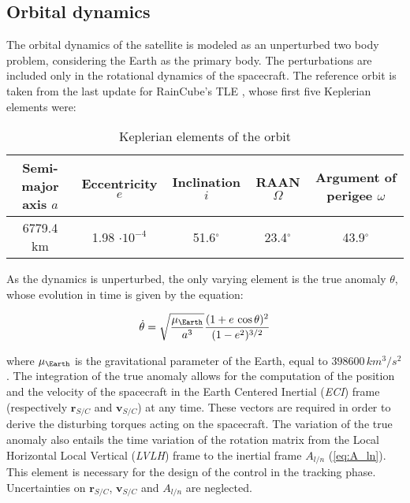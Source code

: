\subsection{Orbital dynamics}

The orbital dynamics of the satellite is modeled as an unperturbed two body problem, considering the Earth as the primary body. The perturbations are included only in the rotational dynamics of the spacecraft. The reference orbit is taken from the last update for RainCube's TLE \cite{raincube_orbit}, whose first five Keplerian elements were:

\begin{table}[h!]
    \centering
    \caption{Keplerian elements of the orbit}
    \begin{tabular}{ccccc}
    \toprule
    \toprule
    \textbf{Semi-major axis} $a$ & \textbf{Eccentricity} $e$ & \textbf{Inclination} $i$ & \textbf{RAAN} $\Omega$ & \textbf{Argument of perigee} $\omega$ \\
    \midrule
    6779.4 km &  1.98 $\cdot10^{-4}$ & 51.6$^{\circ}$ & 23.4$^{\circ}$ & 43.9$^{\circ}$ \\
    \bottomrule
    \bottomrule
    \end{tabular}
    \label{tab:keplerian_elements}
\end{table}

As the dynamics is unperturbed, the only varying element is the true anomaly $\theta$, whose evolution in time is given by the equation:

\begin{equation}
    \dot{\theta} = \sqrt{\frac{\mu_{\Earth}}{a^3}} \frac{(1 + e\,\cos \theta)^2}{(1 - e^2)^{3/2}}
\end{equation}

where $\mu_{\Earth}$ is the gravitational parameter of the Earth, equal to $398600\,km^3/s^2$. The integration of the true anomaly allows for the computation of the position and the velocity of the spacecraft in the Earth Centered Inertial (\textit{ECI}) frame (respectively $\mathbf{r}_{S/C}$ and $\mathbf{v}_{S/C}$) at any time. These vectors are required in order to derive the disturbing torques acting on the spacecraft. The variation of the true anomaly also entails the time variation of the rotation matrix from the Local Horizontal Local Vertical (\textit{LVLH}) frame to the inertial frame $A_{l/n}$ (\cref{eq:A_ln}). This element is necessary for the design of the control in the tracking phase. Uncertainties on $\mathbf{r}_{S/C}$, $\mathbf{v}_{S/C}$ and $A_{l/n}$ are neglected.

